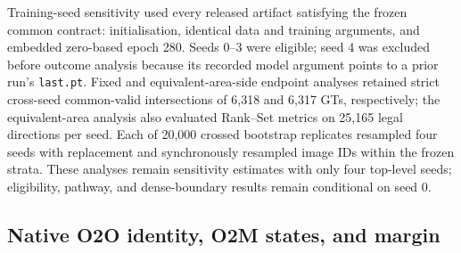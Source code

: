 Training-seed sensitivity used every released artifact satisfying the frozen common contract:  initialisation, identical data and training arguments, and embedded zero-based epoch 280. Seeds 0--3 were eligible; seed 4 was excluded before outcome analysis because its recorded model argument points to a prior run's \texttt{last.pt}. Fixed and equivalent-area-side endpoint analyses retained strict cross-seed common-valid intersections of 6,318 and 6,317 GTs, respectively; the equivalent-area analysis also evaluated Rank--Set metrics on 25,165 legal directions per seed. Each of 20,000 crossed bootstrap replicates resampled four seeds with replacement and synchronously resampled image IDs within the frozen strata. These analyses remain sensitivity estimates with only four top-level seeds; eligibility, pathway, and dense-boundary results remain conditional on seed 0.

\subsection{Native O2O identity, O2M states, and margin}


